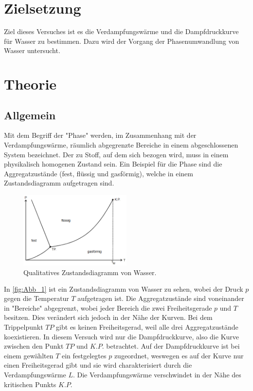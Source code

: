 \section{Zielsetzung}
\label{sec: Zielsetzung}
Ziel dieses Versuches ist es die Verdampfungswärme und die Dampfdruckkurve für Wasser zu bestimmen. 
Dazu wird der Vorgang der Phasenumwandlung von Wasser untersucht.

\section{Theorie}
\label{sec:Theorie}
\subsection{Allgemein} %
\label{sub:Allgemein}
Mit dem Begriff der "Phase" werden, im Zusammenhang mit der Verdampfungswärme, räumlich abgegrenzte Bereiche in einem abgeschlossenen System bezeichnet.
Der zu Stoff, auf dem sich bezogen wird, muss in einem physikalisch homogenen Zustand sein. 
Ein Beispiel für die Phase sind die Aggregatzustände (fest, flüssig und gasförmig), welche in einem Zustandsdiagramm aufgetragen sind.
\begin{figure}[H]
    \centering
    \includegraphics[width=0.5\textwidth]{build/Abb_1.PNG}
    \caption {Qualitatives Zustandsdiagramm von Wasser.\cite{v203}}
    \label{fig:Abb_1}
\end{figure}
\noindent In \autoref{fig:Abb_1} ist ein Zustandsdiagramm von Wasser zu sehen, wobei der Druck $p$ gegen die Temperatur $T$ aufgetragen ist.
Die Aggregatzustände sind voneinander in "Bereiche" abgegrenzt, wobei jeder Bereich die zwei Freiheitsgerade $p$ und $T$ besitzen.
Dies verändert sich jedoch in der Nähe der Kurven. 
Bei dem Trippelpunkt $TP$ gibt es keinen Freiheitsgerad, weil alle drei Aggregatzustände koexistieren.
In diesem Versuch wird nur die Dampfdruckkurve, also die Kurve zwischen den Punkt $TP$ und $K.P.$ betrachtet.
Auf der Dampfdruckkurve ist bei einem gewählten $T$ ein festgelegtes $p$ zugeordnet, weswegen es auf der Kurve nur einen Freiheitsgerad gibt und sie wird charakterisiert durch die Verdampfungswärme $L$.
Die Verdampfungswärme verschwindet in der Nähe des kritischen Punkts $K.P.$

